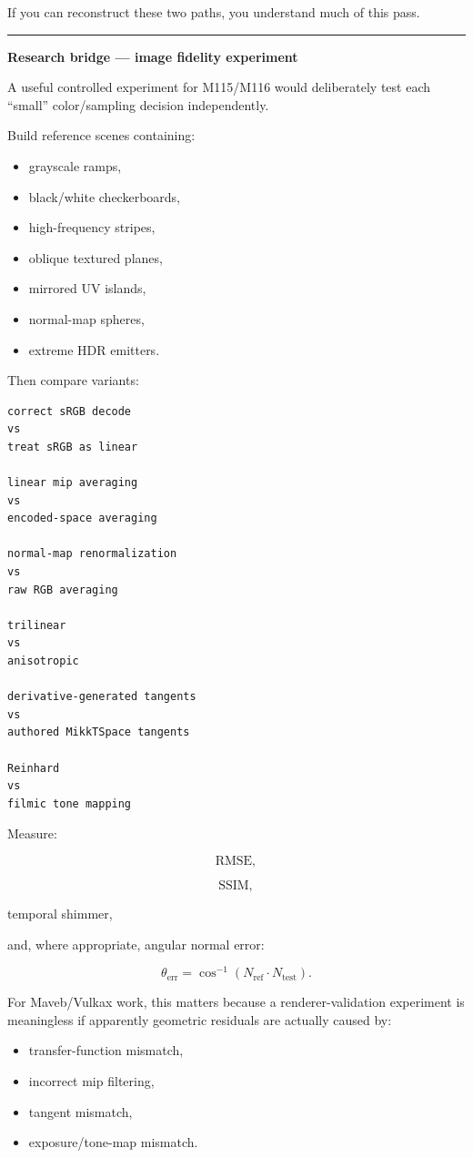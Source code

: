 If you can reconstruct these two paths, you understand much of this pass.

\begin{center}\rule{0.5\linewidth}{0.5pt}\end{center}

\textbf{Research bridge --- image fidelity experiment}

A useful controlled experiment for M115/M116 would deliberately test each ``small'' color/sampling decision independently.

Build reference scenes containing:

\begin{itemize}
\tightlist
\item
  grayscale ramps,
\item
  black/white checkerboards,
\item
  high-frequency stripes,
\item
  oblique textured planes,
\item
  mirrored UV islands,
\item
  normal-map spheres,
\item
  extreme HDR emitters.
\end{itemize}

Then compare variants:

\begin{verbatim}
correct sRGB decode
vs
treat sRGB as linear

linear mip averaging
vs
encoded-space averaging

normal-map renormalization
vs
raw RGB averaging

trilinear
vs
anisotropic

derivative-generated tangents
vs
authored MikkTSpace tangents

Reinhard
vs
filmic tone mapping
\end{verbatim}

Measure:

\[
\text{RMSE},
\]

\[
\text{SSIM},
\]

temporal shimmer,

and, where appropriate, angular normal error:

\[
\boxed{
\theta_{\text{err}}
=
\cos^{-1}
(
N_{\text{ref}}\cdot N_{\text{test}}
)
}.
\]

For Maveb/Vulkax work, this matters because a renderer-validation experiment is meaningless if apparently geometric residuals are actually caused by:

\begin{itemize}
\tightlist
\item
  transfer-function mismatch,
\item
  incorrect mip filtering,
\item
  tangent mismatch,
\item
  exposure/tone-map mismatch.
\end{itemize}

